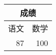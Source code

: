 \documentclass [nofonts] {ctexart}
\begin{document}
\begin{tabular}{|r|r|}
	\hline
	\multicolumn{2}{|c|}{成绩}	\\
	\hline
	语文	& 数学	\\
	\hline
	87		& 100	\\
	\hline
\end{tabular}
\end{document}
